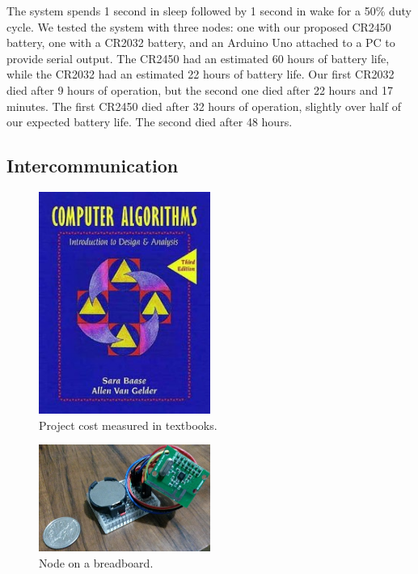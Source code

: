 The system spends 1 second in sleep followed by 1 second in wake for a 50\% duty cycle. We tested the system with three nodes: one with our proposed CR2450 battery, one with a CR2032 battery, and an Arduino Uno attached to a PC to provide serial output. The CR2450 had an estimated 60 hours of battery life, while the CR2032 had an estimated 22 hours of battery life. Our first CR2032 died after 9 hours of operation, but the second one died after 22 hours and 17 minutes.
The first CR2450 died after 32 hours of operation, slightly over half of our expected battery life. The second died after 48 hours.

\subsection{Intercommunication}

\begin{figure}[h!]
  \centering
  \includegraphics[width=0.5\textwidth]{images/textbook.png}
  \caption{Project cost measured in textbooks.
  \label{img:flowchart}
  }
\end{figure}

\begin{figure}[h!]
  \centering
  \includegraphics[width=0.5\textwidth]{images/phone_picture.png}
  \caption{Node on a breadboard.
  \label{img:flowchart}
  }
\end{figure}

